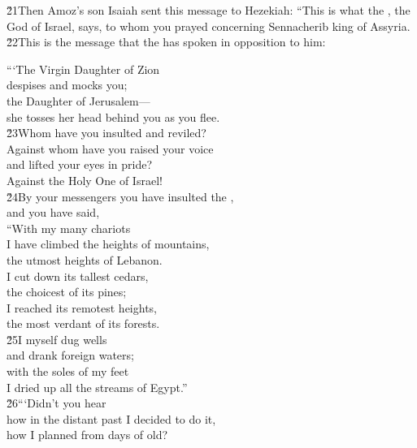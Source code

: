 \v{21}Then Amoz's son Isaiah sent this message to Hezekiah: ``This is what the , the God of Israel, says, to whom you prayed concerning Sennacherib king of Assyria. \v{22}This is the message that the  has spoken in opposition to him:

\begin{poetry}
\poeml ```The Virgin Daughter of Zion \\
\poemll    despises and mocks you; \\
\poeml the Daughter of Jerusalem--- \\
\poemll    she tosses her head behind you as you flee. \\
\poeml \v{23}Whom have you insulted and reviled? \\
\poemll    Against whom have you raised your voice \\
\poeml and lifted your eyes in pride? \\
\poemll    Against the Holy One of Israel! \\
\poeml \v{24}By your messengers you have insulted the , \\
\poemll    and you have said, \\
\poeml ``With my many chariots \\
\poemll    I have climbed the heights of mountains, \\
\poemlll       the utmost heights of Lebanon. \\
\poeml I cut down its tallest cedars, \\
\poemll    the choicest of its pines; \\
\poeml I reached its remotest heights, \\
\poemll    the most verdant of its forests. \\
\poeml \v{25}I myself dug wells \\
\poemll    and drank foreign waters; \\
\poeml with the soles of my feet \\
\poemll    I dried up all the streams of Egypt.'' \\
\poeml \v{26}```Didn't you hear \\
\poemll    how in the distant past I decided to do it, \\
\poemlll       how I planned from days of old? \\

\end{poetry}
